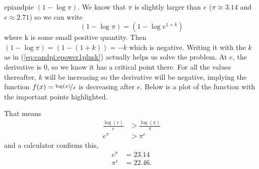 \begin{answer}{epiandpie}
$(1 - \log \pi)$.
We know that $\pi$ is slightly larger than $e$
($\pi \approx 3.14$ and $e \approx 2.71$)
so we can write
\begin{equation}
\label{eq:eandpi:epower1plusk}
(1 - \log \pi)
=
(1 - \log e^{1 + k})
\end{equation}
where k is some small positive quantity.
Then
$(1 - \log \pi) =
(1 - (1 + k) ) = - k $ which is negative.
Writing it with the $k$ as in (\ref{eq:eandpi:epower1plusk}) actually helps us solve the problem.
At $e$, the derivative is 0, so we know it has a critical point there.
For all the values thereafter, $k$ will be increasing so the derivative will be negative, implying the function $f(x)=\nicefrac{\log(x)}{x}$ is decreasing after $e$.
Below is a plot of the function with the important points highlighted.
\begin{center}
\end{center}
That means
\begin{align*}
\frac{\log(e)}{e}
&>
\frac{\log(\pi)}{\pi}
\\
e^\pi
&>
\pi^e
\end{align*}
and a calculator confirms this,
\begin{align*}
e^\pi &= 23.14
\\
\pi^e &= 22.46
\text{.}
\end{align*}
\end{answer}

